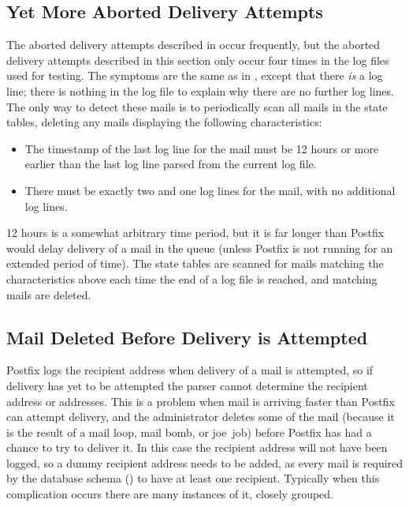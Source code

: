 \subsection{Yet More Aborted Delivery Attempts}

\label{yet more aborted delivery attempts}

The aborted delivery attempts described in  occur frequently, but the aborted delivery attempts described in
this section only occur four times in the \numberOFlogFILES{} log files
used for testing.  The symptoms are the same as in , except that there \textit{is\/} a  log
line; there is nothing in the log file to explain why there are no further
log lines.  The only way to detect these mails is to periodically scan all
mails in the state tables, deleting any mails displaying the following
characteristics:

\begin{itemize}

    \item The timestamp of the last log line for the mail must be 12 hours
        or more earlier than the last log line parsed from the current log
        file.

    \item There must be exactly two  and one 
        log lines for the mail, with no additional log lines.

\end{itemize}

12 hours is a somewhat arbitrary time period, but it is far longer than
Postfix would delay delivery of a mail in the queue (unless Postfix is not
running for an extended period of time).  The state tables are scanned for
mails matching the characteristics above each time the end of a log file is
reached, and matching mails are deleted.

\subsection{Mail Deleted Before Delivery is Attempted}

\label{Mail deleted before delivery is attempted}

Postfix logs the recipient address when delivery of a mail is attempted, so
if delivery has yet to be attempted the parser cannot determine the
recipient address or addresses.  This is a problem when mail is arriving
faster than Postfix can attempt delivery, and the administrator deletes
some of the mail (because it is the result of a mail loop, mail bomb, or joe~job) before
Postfix has had a chance to try to deliver it.  In this case the recipient
address will not have been logged, so a dummy recipient address needs to be
added, as every mail is required by the database schema
() to have at least one recipient.  Typically
when this complication occurs there are many instances of it, closely
grouped.

